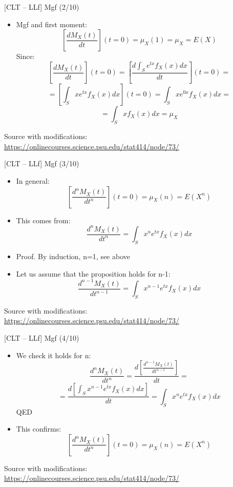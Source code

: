 \documentclass{beamer}
\begin{document}
\begin{frame}
{\centerline{[CLT -- LLf] Mgf (2/10)}}

\begin{itemize}
\item Mgf and first moment:
$$ \left [ \frac{dM_X(t)}{dt} \right ] (t=0) = \mu_X(1) = \mu_X = E(X)$$
Since:
$$ \left [ \frac{dM_X(t)}{dt} \right ] (t=0) = \left [ \frac{d\int_S e^{tx}f_X(x)dx}{dt} \right ] (t=0) = $$
$$ = \left [ \int_S xe^{tx}f_X(x)dx \right ] (t=0) = \int_S xe^{0x}f_X(x)dx= $$
$$= \int_S xf_X(x)dx = \mu_X$$

\end{itemize}

\begin{center}
\tiny 
Source with modifications: \url{https://onlinecourses.science.psu.edu/stat414/node/73/}
\end{center}
\end{frame}


\begin{frame}
{\centerline{[CLT -- LLf] Mgf (3/10)}}

\begin{itemize}
\item In general:
$$ \left [ \frac{d^nM_X(t)}{dt^n} \right ] (t=0)  = \mu_X(n) = E(X^n)$$
\item This comes from:
$$ \frac{d^nM_X(t)}{dt^n} =  \int_S x^ne^{tx}f_X(x)dx$$
\item Proof. By induction, n=1, see above
\item Let us assume that the proposition holds for n-1:
$$ \frac{d^{n-1}M_X(t)}{dt^{n-1}} =  \int_S x^{n-1}e^{tx}f_X(x)dx$$

\end{itemize}

\begin{center}
\tiny 
Source with modifications: \url{https://onlinecourses.science.psu.edu/stat414/node/73/}
\end{center}
\end{frame}


\begin{frame}
{\centerline{[CLT -- LLf] Mgf (4/10)}}

\begin{itemize}
\item We check it holds for n:
$$ \frac{d^nM_X(t)}{dt^n} =   \frac{d \left [  \frac{d^{n-1}M_X(t)}{dt^{n-1}} \right ]}{dt} = $$
$$  =   \frac{d \left [  \int_S x^{n-1}e^{tx}f_X(x)dx \right ]}{dt} = \int_S x^ne^{tx}f_X(x)dx $$
QED
\item This confirms:
$$ \left [ \frac{d^nM_X(t)}{dt^n} \right ] (t=0)  = \mu_X(n) = E(X^n)$$

\end{itemize}
\begin{center}
\tiny 
Source with modifications: \url{https://onlinecourses.science.psu.edu/stat414/node/73/}
\end{center}
\end{frame}
\end{document}
